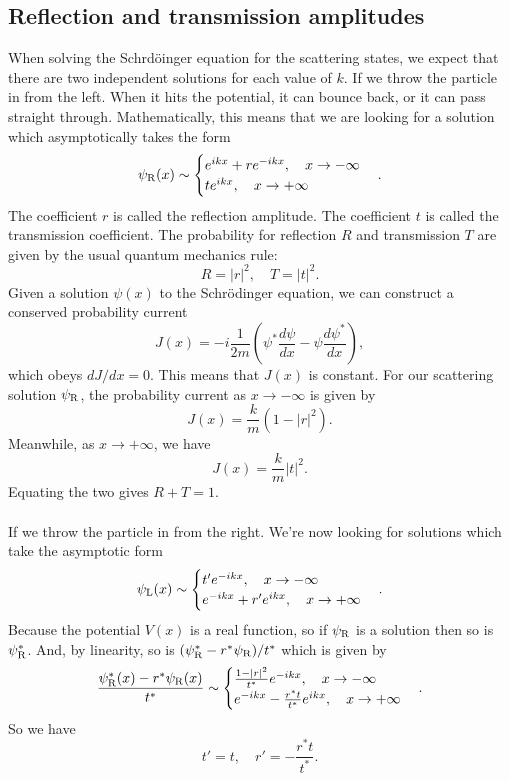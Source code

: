 \subsection{Reflection and transmission amplitudes}
When solving the Schrd\"{o}inger equation for the scattering states, we expect that there are two independent solutions for each value of $k$.
If we throw the particle in from the left. When it hits the potential, it can bounce back, or it can pass straight through. 
Mathematically, this means that we are looking for a solution which asymptotically takes the form
\[\psi_{\rm R}(x) \sim \begin{cases} e^{ikx} + re^{-ikx} , \quad x \to -\infty \\ te^{ikx} , \quad x \to +\infty \end{cases}.\]
The coefficient $r$ is called the reflection amplitude. The coefficient $t$ is called the transmission coefficient. The probability for reflection $R$ and transmission $T$ are given by the usual quantum mechanics rule:
\[R = |r|^2 , \quad T = |t|^2.\]
Given a solution $\psi(x)$ to the Schr\"{o}dinger equation, we can construct a conserved probability current
\[J(x) = -i\frac{1}{2m}\left( \psi^*\frac{d\psi}{dx} - \psi\frac{d\psi^*}{dx}\right),\]
which obeys $dJ/dx = 0$. This means that $J(x)$ is constant. For our scattering solution $\psi_{\rm R}$, the probability current as $x\to-\infty$ is given by
\[J(x) = \frac{k}{m}(1-|r|^2).\]
Meanwhile, as $x \to +\infty$, we have
\[J(x) = \frac{k}{m} |t|^2.\]
Equating the two gives $R + T =1$.
\\ \\
If we throw the particle in from the right. We're now looking for solutions which take the asymptotic form
\[\psi_{\rm L}(x) \sim \begin{cases} t'e^{-ikx}  , \quad x \to -\infty \\ e^{-ikx} + r'e^{ikx} , \quad x \to +\infty \end{cases}.\]
Because the potential $V (x) $ is a real function, so if $\psi_{\rm R}$ is a solution then so is $\psi^*_{\rm R}$. And, by linearity, so is $(\psi^*_{\rm R} - r^*\psi_{\rm R}) / t^* $ which is given by
\[\frac{\psi^*_{\rm R}(x) - r^*\psi_{\rm R}(x)}{t^*} \sim \begin{cases} \frac{1-|r|^2}{t^*} e^{-ikx}  , \quad x \to -\infty \\ e^{-ikx} - \frac{r^* t}{t^*}e^{ikx} , \quad x \to +\infty \end{cases}.\]
So we have
\[t' = t , \quad r' = -\frac{r^* t}{t^*}.\]

